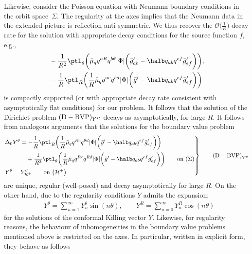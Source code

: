 Likewise, consider the Poisson equation with Neumann boundary conditions in the orbit space~$\Sigma$. The regularity at the axes implies that the Neumann data in the extended picture is reflection anti-symmetric. We thus recover the $\mathcal{O} \bigl(\frac{1}{R}\bigr)$ decay rate for the solution with appropriate decay conditions for the source function $f$, e.g.,
\begin{align*}
&-\frac{1}{R^2} \ptl_ \theta \biggl(\bar{\mu}_q q^{aR} q^{b \theta} \vert \Phi \vert \biggl(\bar{g}'_{ab} - \halb q_{ab} q^{ef} \bar{g}'_{ef}\biggr)\biggr), \\
&- \frac{1}{R} \ptl_R \biggl(\frac{1}{R} \bar{\mu}_q q^{ac} q^{bd} \vert \Phi \vert \biggl(\bar{g}' - \halb q_{ab} q^{ef} \bar{g}'_{ef}\biggr)\biggr)
\end{align*}
is compactly supported (or with appropriate decay rate consistent with asymptotically flat conditions) for our problem.
It follows that the solution of the Dirichlet problem $({\rm D-BVP})_{Y^R}$ decays as
 asymptotically, for large $R$. It follows from analogous arguments that the solutions for the boundary value problem
\begin{equation*}
\left.\begin{aligned}
&\Delta_0 Y^\theta= - \frac{1}{R} \ptl_R \biggl(\frac{1}{R} \bar{\mu}_q q^{Rc} q^{\theta d} \vert \Phi \vert \biggl(\bar{g}' - \halb q_{ab} q^{ef} \bar{g}'_{ef}\biggr)\biggr)
\notag\\
&\hphantom{\Delta_0 Y^\theta=}{}
+ \frac{1}{R^3} \ptl_\theta \biggl(\frac{1}{R} \bar{\mu}_q q^{Rc} q^{Rd} \vert \Phi \vert \biggl(\bar{g}' - \halb q_{ab} q^{ef} \bar{g}'_{ef}\biggr)\biggr) \qquad \text{on} \ (\Sigma)\\
&Y^\theta= Y^\theta_{\mathcal{H}^+} \qquad \text{on} \ \bigl(\mathcal{H}^+\bigr)
\end{aligned}
 \right\}
\tag*{${\rm (D-BVP)}_{Y^\theta}$}
\end{equation*}
are unique, regular (well-posed) and decay  asymptotically for large $R$.
On the other hand, due to the regularity conditions $Y$ admits the expansion:
	\begin{align*}
	&Y^{\theta}= \sum^{\infty}_{n=1} Y^{\theta}_n \sin (n \theta), \qquad
	Y^{R}= \sum^{\infty}_{n=0} Y^R_n \cos(n \theta)
	\end{align*}
for the solutions of the conformal Killing vector $Y$. Likewise, for regularity reasons, the behaviour of inhomogeneities in the boundary value problems mentioned above is restricted on the axes. In particular, written in explicit form, they behave as follows
